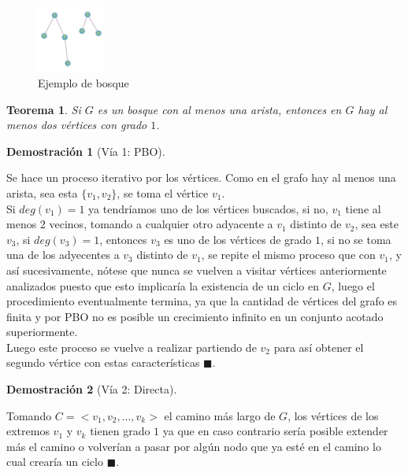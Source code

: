 \documentclass[a4paper,1pt]{report}
\newtheorem*{teo}{Teorema}
\newtheorem*{dem}{Demostración}
\begin{document}
\begin{figure}[H]
    \centering
    \includegraphics[width=0.2\textwidth]{figures2/bosque.png}
    \caption{Ejemplo de bosque}
\end{figure}


\begin{teo}
    Si $G$ es un bosque con al menos una arista, entonces en $G$ hay al menos dos v\'ertices con grado $1$.
\end{teo}

\begin{dem}[V\'ia 1: PBO]\end{dem}
    Se hace un proceso iterativo por los v\'ertices. Como en el grafo hay al menos una arista, sea esta $\{v_1, v_2\}$, se toma el v\'ertice $v_1$.\\
    
    Si $deg(v_1) = 1$ ya tendr\'iamos uno de los v\'ertices buscados, si no, $v_1$ tiene al menos $2$ vecinos, tomando a cualquier otro adyacente a $v_1$ distinto de $v_2$, sea este $v_3$, si $deg(v_3) = 1$, entonces $v_3$ es uno de los v\'ertices de grado $1$, si no se toma una de los adyecentes a $v_3$ distinto de $v_1$, se repite el mismo proceso que con $v_1$, y as\'i sucesivamente, n\'otese que nunca se vuelven a visitar v\'ertices anteriormente analizados puesto que esto implicar\'ia la existencia de un ciclo en $G$, luego el procedimiento eventualmente termina, ya que la cantidad de v\'ertices del grafo es finita y por PBO no es posible un crecimiento infinito en un conjunto acotado superiormente.\\
    
    Luego este proceso se vuelve a realizar partiendo de $v_2$ para as\'i obtener el segundo v\'ertice con estas caracter\'isticas $\blacksquare$.

\begin{dem}[V\'ia 2: Directa]\end{dem}

    Tomando $C = <v_1, v_2, ..., v_k>$ el camino m\'as largo de $G$, los v\'ertices de los extremos $v_1$ y  $v_k$ tienen grado $1$ ya que en caso contrario ser\'ia posible extender m\'as el camino o volver\'ian a pasar por alg\'un nodo que ya est\'e en el camino lo cual crear\'ia un ciclo $\blacksquare$.
\end{document}
